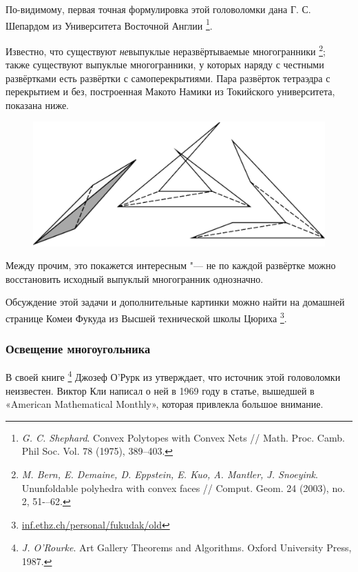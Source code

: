 \documentclass[twoside]{book}
\begin{document}
По-видимому, первая точная формулировка этой головоломки дана Г. С. Шепардом из Университета Восточной Англии%
\footnote{\emph{G. C. Shephard}. Convex Polytopes with Convex Nets /\!/ {Math. Proc. Camb. Phil Soc.} Vol. 78 (1975), 389--403.}.
 
Известно, что существуют \emph{не}выпуклые неразвёртываемые многогранники%
\footnote{\emph{M. Bern, E. Demaine, D. Eppstein, E. Kuo, A. Mantler, J. Snoeyink}. 
  Ununfoldable poly\-hedra with convex faces /\!/
  {Comput. Geom.} 24 (2003), no. 2, 51-–62.};
также существуют выпуклые многогранники, у которых наряду с честными развёртками есть развёртки с самоперекрытиями. 
Пара развёрток тетраэдра с перекрытием и без, построенная Макото Намики из Токийского университета, показана ниже.

\begin{figure}[!ht]
\centering
\includegraphics[scale=0.5]{Figs/UnsolvedPuzzles/unfold}
\end{figure}

Между прочим, это покажется интересным "--- не по каждой развёртке можно восстановить исходный выпуклый многогранник однозначно. %

Обсуждение этой задачи и дополнительные картинки можно найти на домашней странице Комеи Фукуда из Высшей технической школы Цюриха%
\footnote{\href{https://inf.ethz.ch/personal/fukudak/old/}{\url{inf.ethz.ch/personal/fukudak/old}}}.

\subsubsection*{Освещение многоугольника}

В своей книге%
\footnote{\emph{J. O'Rourke}. {Art Gallery Theorems and Algorithms.} Oxford University Press, 1987.}
Джозеф О’Рурк %
из  утверждает, что источник этой головоломки неизвестен.
Виктор Кли написал о ней в 1969 году в статье, вышедшей в «American Mathe\-ma\-tical Monthly», которая привлекла большое внимание. 
\end{document}
